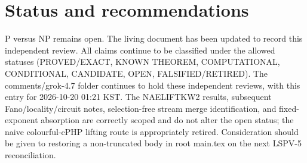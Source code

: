 \documentclass[11pt]{article}
\begin{document}
\section{Status and recommendations}
P versus NP remains open. The living document has been updated to record this independent review. All claims continue to be classified under the allowed statuses (PROVED/EXACT, KNOWN THEOREM, COMPUTATIONAL, CONDITIONAL, CANDIDATE, OPEN, FALSIFIED/RETIRED). The comments/grok-4.7 folder continues to hold these independent reviews, with this entry for 2026-10-20 01:21 KST. The NAELIFTKW2 results, subsequent Fano/locality/circuit notes, selection-free stream merge identification, and fixed-exponent absorption are correctly scoped and do not alter the open status; the naive colourful-cPHP lifting route is appropriately retired. Consideration should be given to restoring a non-truncated body in root main.tex on the next LSPV-5 reconciliation.

\end{document}

